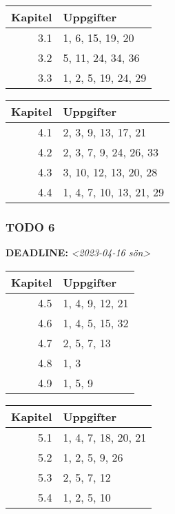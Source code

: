 \documentclass[11pt]{article}
\begin{document}
\begin{center}
\begin{tabular}{rl}
Kapitel & Uppgifter\\[0pt]
\hline
3.1 & 1, 6, 15, 19, 20\\[0pt]
3.2 & 5, 11, 24, 34, 36\\[0pt]
3.3 & 1, 2, 5, 19, 24, 29\\[0pt]
\end{tabular}
\end{center}


\begin{center}
\begin{tabular}{rl}
Kapitel & Uppgifter\\[0pt]
\hline
4.1 & 2, 3, 9, 13, 17, 21\\[0pt]
4.2 & 2, 3, 7, 9, 24, 26, 33\\[0pt]
4.3 & 3, 10, 12, 13, 20, 28\\[0pt]
4.4 & 1, 4, 7, 10, 13, 21, 29\\[0pt]
\end{tabular}
\end{center}


\subsubsection{{\bfseries\sffamily TODO} 6}
\label{sec:orgbbba108}
\noindent\textbf{DEADLINE:} \textit{<2023-04-16 sön>}\\[0pt]
\begin{center}
\begin{tabular}{rl}
Kapitel & Uppgifter\\[0pt]
\hline
4.5 & 1, 4, 9, 12, 21\\[0pt]
4.6 & 1, 4, 5, 15, 32\\[0pt]
4.7 & 2, 5, 7, 13\\[0pt]
4.8 & 1, 3\\[0pt]
4.9 & 1, 5, 9\\[0pt]
\end{tabular}
\end{center}


\begin{center}
\begin{tabular}{rl}
Kapitel & Uppgifter\\[0pt]
\hline
5.1 & 1, 4, 7, 18, 20, 21\\[0pt]
5.2 & 1, 2, 5, 9, 26\\[0pt]
5.3 & 2, 5, 7, 12\\[0pt]
5.4 & 1, 2, 5, 10\\[0pt]
\end{tabular}
\end{center}
\end{document}
